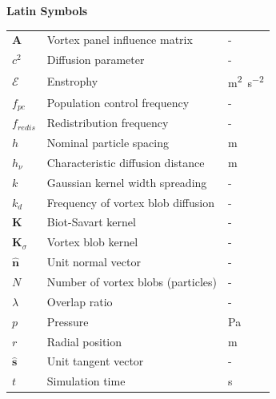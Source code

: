 {\textbf{\textsf{Latin Symbols}}}

{\renewcommand{\arraystretch}{1.2} %
\begin{longtable}{p{1.5cm}p{10.5cm}p{1.5cm}}
    $\mathbf{A}$			& Vortex panel influence matrix						& -\\         

	$c^2$ 					& Diffusion parameter 								& - \\

    $\mathcal{E}$			& Enstrophy			  								& \si{m^2.s^{-2}} \\

	$f_{pc}$				& Population control frequency & - \\
	$f_{redis}$				& Redistribution frequency & - \\
	
    $h$						& Nominal particle spacing							& \si{m}\\   
    $h_{\nu}$				& Characteristic diffusion distance					& \si{m}\\ 

	$k$ & Gaussian kernel width spreading	& -\\
	$k_d$ & Frequency of vortex blob diffusion  								& -\\
    $\mathbf{K}$			& Biot-Savart kernel 								& -\\ 
    $\mathbf{K}_{\sigma}$	& Vortex blob kernel 								& -\\     

	$\hat{\mathbf{n}}$  	& Unit normal vector 								& -\\
	$N$  					& Number of vortex blobs (particles) 				& -\\

	$\lambda$			& Overlap ratio 									& - \\    
	
	$p$						& Pressure											& \si{Pa}\\

	$r$ 					& Radial position 									& \si{m}\\
	
	$\hat{\mathbf{s}}$		& Unit tangent vector								& - \\
	
	$t$						& Simulation time									& \si{s} \\
	

\end{longtable}}
